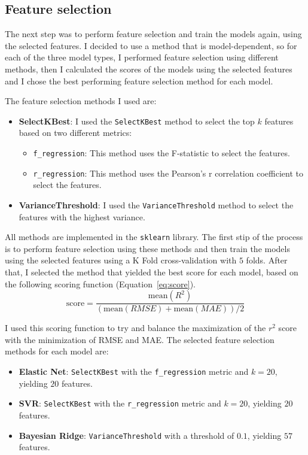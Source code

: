 \documentclass[12pt]{article}
\begin{document}
\subsection{Feature selection}
The next step was to perform feature selection and train the models again, using the
selected features. I decided to use a method that is model-dependent, so for each
of the three model types, I performed feature selection using different methods, then
I calculated the scores of the models using the selected features and I chose the
best performing feature selection method for each model.

The feature selection methods I used are:
\begin{itemize}
    \item \textbf{SelectKBest}: I used the \texttt{SelectKBest} method to select the
    top $k$ features based on two different metrics:
    \begin{itemize}
        \item \texttt{f\_regression}: This method uses the F-statistic to select
        the features.
        \item \texttt{r\_regression}: This method uses the Pearson's r
        correlation coefficient to select the features.
    \end{itemize}
    \item \textbf{VarianceThreshold}: I used the \texttt{VarianceThreshold} method
    to select the features with the highest variance.
\end{itemize}

All methods are implemented in the \texttt{sklearn} library. The first stip of the
process is to perform feature selection using these methods and then train the
models using the selected features using a K Fold cross-validation with $5$ folds.
After that, I selected the method that yielded the best score for each model, based
on the following scoring function (Equation~\ref{eq:score}).
\begin{equation}    
\text{score} = \frac{
    \text{mean}(R^2)
    }{
    (\text{mean}(RMSE) + \text{mean}(MAE)) / 2
    }
    \label{eq:score}
\end{equation}

I used this scoring function to try and balance the maximization of the $r^2$ score
with the minimization of RMSE and MAE. The selected feature selection methods for
each model are:
\begin{itemize}
    \item \textbf{Elastic Net}: \texttt{SelectKBest} with the \texttt{f\_regression}
    metric and $k=20$, yielding $20$ features.
    \item \textbf{SVR}: \texttt{SelectKBest} with the \texttt{r\_regression} metric
    and $k=20$, yielding $20$ features.
    \item \textbf{Bayesian Ridge}: \texttt{VarianceThreshold} with a threshold of
    $0.1$, yielding $57$ features.
\end{itemize}
\end{document}
